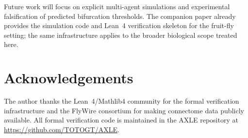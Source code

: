 \documentclass[12pt,a4paper]{article}
\begin{document}
Future work will focus on explicit multi-agent simulations and
experimental falsification of predicted bifurcation thresholds.
The companion paper \cite{Grossi2026_FruitFly} already provides
the simulation code and Lean~4 verification skeleton for the
fruit-fly setting; the same infrastructure applies to the broader
biological scope treated here.

\section*{Acknowledgements}

The author thanks the Lean~4/Mathlib4 community for the formal
verification infrastructure and the FlyWire consortium
\cite{Dorkenwald2024} for making connectome data publicly available.
All formal verification code is maintained in the AXLE repository
\cite{AXLE2026} at \url{https://github.com/TOTOGT/AXLE}.
\end{document}
